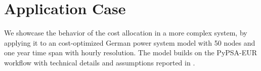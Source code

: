 \documentclass[11pt,twocolumn]{article}
\newcommand{\lmp}[1][n]{\lambda_{#1,t}}
\newcommand{\demand}[1][n]{d_{#1,t}}
\begin{document}



\section{Application Case}

We showcase the behavior of the cost allocation in a more complex system, by applying it to an cost-optimized German power system model with 50 nodes and one year time span with hourly resolution. The model builds on the PyPSA-EUR workflow \cite{horsch_jonas_pypsa-eur_2020} with technical details and assumptions reported in \cite{horsch_pypsa-eur_2018}. 
\end{document}
